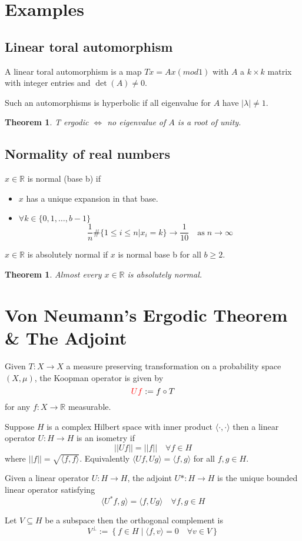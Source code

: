 \documentclass[11pt]{article}
\newcommand{\defeq}{:=}
\newcommand{\norm}[1]{\left|\left|#1\right|\right|}
\newcommand{\relmiddle}[1]{\mathrel{}\middle#1\mathrel{}}
\newcommand{\rmv}{\relmiddle|}
\newcommand{\R}{\mathbb{R}}
\newenvironment{defin}
	{\begin{mdframed}[backgroundcolor=white, roundcorner=5pt, linewidth=1pt]}
	{\end{mdframed}}
\newcommand{\mdf}[1]{{\color{red} #1}}
\newtheorem{theorem}[prop]{Theorem}
\begin{document}
\section{Examples}
\subsection{Linear toral automorphism}
\begin{defin}
A \mdf{linear toral automorphism} is a map $Tx=Ax (mod 1)$ with $A$ a $k\times k$ matrix with integer entries and $\det(A)\neq 0$.

Such an automorphisms is \mdf{hyperbolic} if all eigenvalue for $A$ have $|\lambda|\neq 1$.
\end{defin}
\begin{theorem}
T ergodic $\iff$ no eigenvalue of $A$ is a root of unity.
\end{theorem}
\subsection{Normality of real numbers}
\begin{defin}
$x\in\R$ is \mdf{normal (base b)} if
\begin{itemize}
	\item $x$ has a  unique expansion in that base.
	\item $\forall k\in\{0,1,\dots,b-1\}$
		$$\frac{1}{n}\#\{1\leq i\leq n | x_i=k\}\to\frac{1}{10}\quad\text{as}\;n\to\infty$$
\end{itemize}

$x\in\R$ is \mdf{absolutely normal} if $x$ is normal base b for all $b\geq 2$.
\end{defin}
\begin{theorem}
Almost every $x\in\R$ is absolutely normal.
\end{theorem}

\section{Von Neumann's Ergodic Theorem \& The Adjoint}

\begin{defin}
	Given $T:X\to X$ a measure preserving transformation on a probability space $(X, \mu)$, the \mdf{Koopman operator} is given by
	\[
		\mdf{Uf}\defeq f\circ T
	\]
	for any $f:X\to \R$ measurable.


	Suppose $H$ is a complex Hilbert space with inner product $\langle\cdot, \cdot\rangle$ then a linear operator $U:H\to H$ is an \mdf{isometry} if
	\[
		\norm{Uf}=\norm{f}\quad\forall f\in H
	\]
	where $\norm{f}=\sqrt{\langle f, f\rangle}$.
	Equivalently $\langle Uf, Ug \rangle= \langle f, g\rangle$ for all $f,g \in H$.

	Given a linear operator $U:H\to H$, the \mdf{adjoint} $U*:H\to H$ is the unique bounded linear operator satisfying
	\[
\langle U^\ast f, g \rangle= \langle f, Ug \rangle \quad \forall f, g \in H
	\]

	Let $V\subseteq H$ be a subspace then the \mdf{orthogonal complement} is
	\[
		V^\perp \defeq \left\{ f\in H \rmv \langle f, v \rangle =0 \quad \forall v \in V\right\}
	\]
\end{defin}
\end{document}
